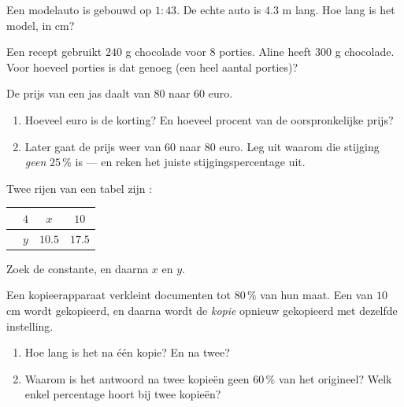 \begin{exercise}[$\star$]\label{exo:g7:prop:7}
Een modelauto is gebouwd op  $1 : 43$. De echte auto is $4.3$ m lang. Hoe
lang is het model, in cm?
\end{exercise}

\begin{exercise}[$\star\star$]\label{exo:g7:prop:8}
Een recept gebruikt $240$ g chocolade voor $8$ porties. Aline heeft $300$ g
chocolade. Voor hoeveel porties is dat genoeg (een heel aantal porties)?
\end{exercise}

\begin{exercise}[$\star\star$]\label{exo:g7:prop:9}
De prijs van een jas daalt van $80$ naar $60$ euro.
\begin{enumerate}
  \item Hoeveel euro is de korting? En hoeveel procent van de oorspronkelijke
        prijs?
  \item Later gaat de prijs weer van $60$ naar $80$ euro. Leg uit waarom die
        stijging \emph{geen} $25\,\%$ is --- en reken het juiste
        stijgingspercentage uit.
\end{enumerate}
\end{exercise}

\begin{exercise}[$\star\star$]\label{exo:g7:prop:10}
Twee rijen van een tabel zijn :
\begin{center}
\renewcommand{\arraystretch}{1.2}
\begin{tabular}{l|ccc}
 & $4$ & $x$ & $10$ \\
\hline
 & $y$ & $10.5$ & $17.5$ \\
\end{tabular}
\end{center}
Zoek de constante, en daarna $x$ en $y$.
\end{exercise}

\begin{exercise}[$\star\star\star$]\label{exo:g7:prop:11}
Een kopieerapparaat verkleint documenten tot $80\,\%$ van hun maat. Een  van
$10$ cm wordt gekopieerd, en daarna wordt de \emph{kopie} opnieuw gekopieerd met
dezelfde instelling.
\begin{enumerate}
  \item Hoe lang is het  na één kopie? En na twee?
  \item Waarom is het antwoord na twee kopieën geen $60\,\%$ van het origineel?
        Welk enkel percentage hoort bij twee kopieën?
\end{enumerate}
\end{exercise}

